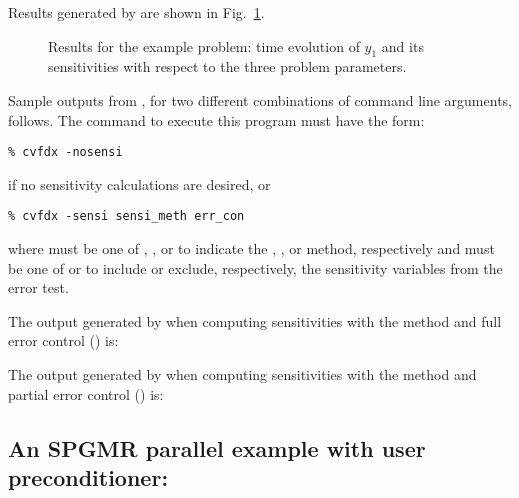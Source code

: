 Results generated by  are shown in Fig.~\ref{f:cvfdx}. 
\begin{figure}
  {\centerline{}}
  \caption[Results for the  example problem.]
  {Results for the  example problem:
    time evolution of $y_1$ and its sensitivities with respect to the
    three problem parameters.}
  \label{f:cvfdx}
\end{figure}
Sample outputs from , for two different combinations of command line arguments, 
follows. The command to execute this program must have the form:
\begin{verbatim}
% cvfdx -nosensi
\end{verbatim} 
if no sensitivity calculations are desired, or
\begin{verbatim}
% cvfdx -sensi sensi_meth err_con
\end{verbatim}
where  must be one of , , or  to
indicate the , , or  method,
respectively and  must be one of  or  to
include or exclude, respectively, the sensitivity variables from the error test.

The output generated by  when computing sensitivities with the 
method and full error control () is:

\vspace{0.1in}

The output generated by  when computing sensitivities with the 
method and partial error control () is:

\vspace{0.1in}


\subsection{An SPGMR parallel example with user preconditioner: }
\label{ss:pvfkx}

